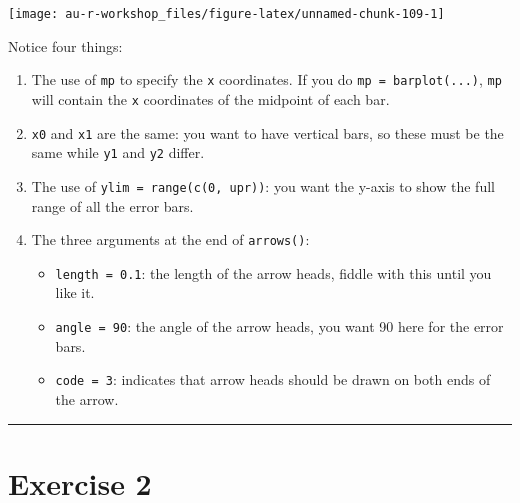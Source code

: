 \documentclass[]{book}
\providecommand{\tightlist}{%
  \setlength{\itemsep}{0pt}\setlength{\parskip}{0pt}}
\begin{document}
\begin{center}\texttt{[image: au-r-workshop\_files/figure-latex/unnamed-chunk-109-1]} \end{center}

Notice four things:

\begin{enumerate}
\def\labelenumi{\arabic{enumi}.}
\tightlist
\item
  The use of \texttt{mp} to specify the \texttt{x} coordinates. If you do \texttt{mp\ =\ barplot(...)}, \texttt{mp} will contain the \texttt{x} coordinates of the midpoint of each bar.
\item
  \texttt{x0} and \texttt{x1} are the same: you want to have vertical bars, so these must be the same while \texttt{y1} and \texttt{y2} differ.
\item
  The use of \texttt{ylim\ =\ range(c(0,\ upr))}: you want the y-axis to show the full range of all the error bars.
\item
  The three arguments at the end of \texttt{arrows()}:

  \begin{itemize}
  \tightlist
  \item
    \texttt{length\ =\ 0.1}: the length of the arrow heads, fiddle with this until you like it.
  \item
    \texttt{angle\ =\ 90}: the angle of the arrow heads, you want 90 here for the error bars.
  \item
    \texttt{code\ =\ 3}: indicates that arrow heads should be drawn on both ends of the arrow.
  \end{itemize}
\end{enumerate}

\begin{center}\rule{0.5\linewidth}{\linethickness}\end{center}

\hypertarget{ex2}{%
\section*{Exercise 2}\label{ex2}}
\end{document}
